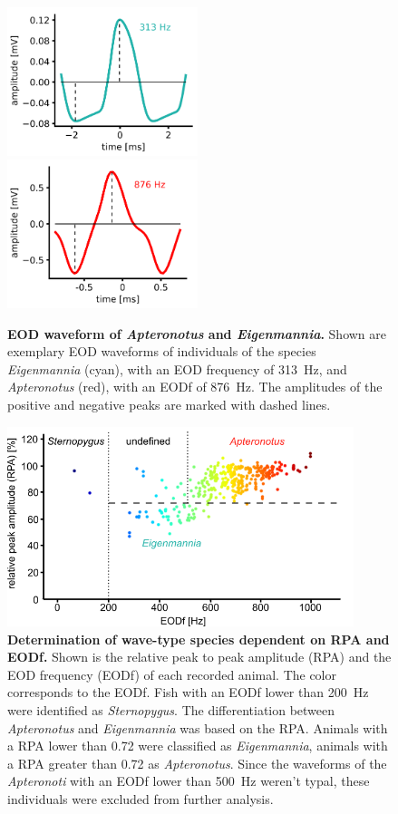 \begin{figure}[H]
    \centering
    \includegraphics[width=0.496\textwidth]{pictures/Methods/waveform_eig.png}
    \includegraphics[width=0.496\textwidth]{pictures/Methods/waveform_apt.png}
    \caption{\textbf{EOD waveform of \textit{Apteronotus} and \textit{Eigenmannia}.} Shown are exemplary EOD waveforms of individuals of the species \textit{Eigenmannia} (cyan), with an EOD frequency of 313~Hz, and \textit{Apteronotus} (red), with an EODf of 876~Hz. The amplitudes of the positive and negative peaks are marked with dashed lines.}
    \label{fig:EOD_waveforms}
\end{figure}{}

\begin{figure}[H]
    \centering
    \includegraphics[width=0.9\textwidth]{pictures/Methods/cluster.png}
    \caption{\textbf{Determination of wave-type species dependent on RPA and EODf.} Shown is the relative peak to peak amplitude (RPA) and the EOD frequency (EODf) of each recorded animal. The color corresponds to the EODf. Fish with an EODf lower than 200~Hz were identified as \textit{Sternopygus}. The differentiation between \textit{Apteronotus} and \textit{Eigenmannia} was based on the RPA. Animals with a RPA lower than 0.72 were classified as \textit{Eigenmannia}, animals with a RPA greater than 0.72 as \textit{Apteronotus}. Since the waveforms of the \textit{Apteronoti} with an EODf lower than 500~Hz weren't typal, these individuals were excluded from further analysis.}
    \label{fig:cluster}
\end{figure}{}